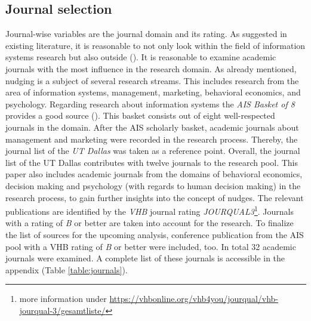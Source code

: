 \subsection{Journal selection}
Journal-wise variables are the journal domain and its rating. As suggested in existing literature, it is reasonable to not only look within the field of information systems research but also outside (\cite{webster_analyzing_2002}). It is reasonable to examine academic journals with the most influence in the research domain. As already mentioned, nudging is a subject of several research streams. This includes research from the area of information systems, management, marketing, behavioral economics, and psychology. Regarding research about information systems the \textit{AIS Basket of 8} provides a good source (\cite{alavi_review_1992}). This basket consists out of eight well-respected journals in the domain. After the AIS scholarly basket, academic journals about management and marketing were recorded in the research process. Thereby, the journal list of the \textit{UT Dallas} was taken as a reference point. Overall, the journal list of the UT Dallas contributes with twelve journals to the research pool. This paper also includes academic journals from the domains of behavioral economics, decision making and psychology (with regards to human decision making) in the research process, to gain further insights into the concept of nudges. The relevant publications are identified by the \textit{VHB} journal rating \textit{JOURQUAL3}\footnote{more information under \url{https://vhbonline.org/vhb4you/jourqual/vhb-jourqual-3/gesamtliste/}}. Journals with a rating of \textit{B} or better are taken into account for the research. To finalize the list of sources for the upcoming analysis, conference publication from the AIS pool with a VHB rating of \textit{B} or better were included, too. In total 32 academic journals were examined. A complete list of these journals is accessible in the appendix (Table \ref{table:journals}).

